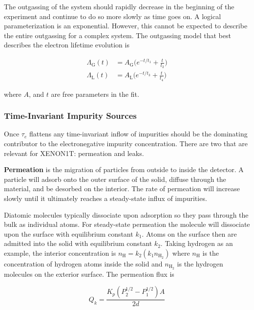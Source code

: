 The outgassing of the system should rapidly decrease in the beginning of the experiment and continue to do so more slowly as time goes
on.  A logical parameterization is an exponential.  However, this cannot be expected to describe the entire outgassing for a complex
system.  The outgassing model that best describes the electron lifetime evolution is

\begin{subequations}
\begin{align}
\Lambda_{\mathrm{G}}(t) &= A_{\mathrm{G}} \bigg( e^{-t/t_1} + \frac{t}{t_2} \bigg) \\
\Lambda_{\mathrm{L}}(t) &= A_{\mathrm{L}} \bigg( e^{-t/t_3} + \frac{t}{t_4} \bigg)
\end{align}
\end{subequations}

\noindent where $A$, and $t$ are free parameters in the fit.



\subsubsection{Time-Invariant Impurity Sources}
\label{subsubsec:electron_lifetime_model_outgassing_leak_sources}
Once $\tau_e$ flattens any time-invariant inflow of impurities should be the dominating contributor to the electronegative impurity
concentration.  There are two that are relevant for XENON1T: permeation and leaks.

\textbf{Permeation} is the migration of particles from outside to inside the detector.  A particle will adsorb onto the outer surface of
the solid, diffuse through the material, and be desorbed on the interior.  The rate of permeation will increase slowly until it ultimately
reaches a steady-state influx of impurities.

Diatomic molecules typically dissociate
upon adsorption so they pass through the bulk as individual atoms.  For steady-state permeation the molecule will dissociate upon the
surface with equilibrium constant $k_1$.  Atoms on the surface then are admitted into the solid with equilibrium constant $k_2$.  Taking
hydrogen as an example, the
interior concentration is $n_{\mathrm{H}} = k_2 (k_1 n_{\mathrm{H_2}})$ where $n_{\mathrm{H}}$ is the concentration of hydrogen atoms
inside the solid and $n_{\mathrm{H_2}}$ is the hydrogen molecules on the exterior surface.  The permeation flux is

\begin{equation}
Q_k = \frac{K_p (P_2^{1/2} - P_1^{1/2})A}{2d}
\label{eq:electron_lifetime_model_outgassing_leak_sources_perm}
\end{equation}

